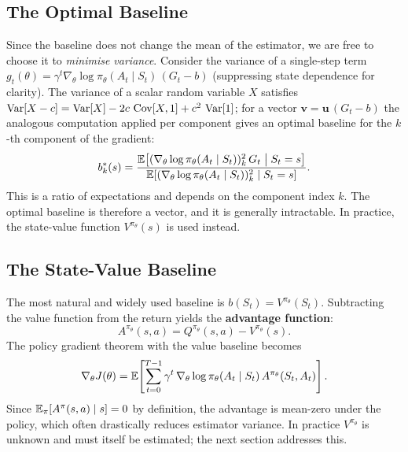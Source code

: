 \subsection{The Optimal Baseline}

Since the baseline does not change the mean of the estimator, we are free to choose it to \emph{minimise variance}.  Consider the variance of a single-step term $g_t(\theta) = \gamma^t \nabla_\theta \log \pi_\theta(A_t \mid S_t)\, (G_t - b)$ (suppressing state dependence for clarity).  The variance of a scalar random variable $X$ satisfies $\operatorname{Var}[X - c] = \operatorname{Var}[X] - 2c\, \operatorname{Cov}[X, 1] + c^2\, \operatorname{Var}[1]$; for a vector $\mathbf{v} = \mathbf{u}\,(G_t - b)$ the analogous computation applied per component gives an optimal baseline for the $k$-th component of the gradient:
\begin{equation}
\label{eq:optimal-baseline}
b^*_k(s) = \frac{\operatorname{\mathbb{E}}\!\left[(\nabla_\theta \log \pi_\theta(A_t \mid S_t))^2_k\, G_t \;\middle|\; S_t = s\right]}{\operatorname{\mathbb{E}}\!\left[(\nabla_\theta \log \pi_\theta(A_t \mid S_t))^2_k \;\middle|\; S_t = s\right]}.
\end{equation}
This is a ratio of expectations and depends on the component index $k$.  The optimal baseline is therefore a vector, and it is generally intractable.  In practice, the state-value function $V^{\pi_\theta}(s)$ is used instead.

\subsection{The State-Value Baseline}

The most natural and widely used baseline is $b(S_t) = V^{\pi_\theta}(S_t)$.  Subtracting the value function from the return yields the \textbf{advantage function}:
\begin{equation}
\label{eq:advantage}
A^{\pi_\theta}(s,a) = Q^{\pi_\theta}(s,a) - V^{\pi_\theta}(s).
\end{equation}
The policy gradient theorem with the value baseline becomes
\begin{equation}
\label{eq:pg-advantage}
\nabla_\theta J(\theta)
= \operatorname{\mathbb{E}}\!\left[\sum_{t=0}^{T-1} \gamma^t\, \nabla_\theta \log \pi_\theta(A_t \mid S_t)\, A^{\pi_\theta}(S_t, A_t)\right].
\end{equation}
Since $\operatorname{\mathbb{E}}_\pi[A^{\pi}(s,a) \mid s] = 0$ by definition, the advantage is mean-zero under the policy, which often drastically reduces estimator variance.  In practice $V^{\pi_\theta}$ is unknown and must itself be estimated; the next section addresses this.

